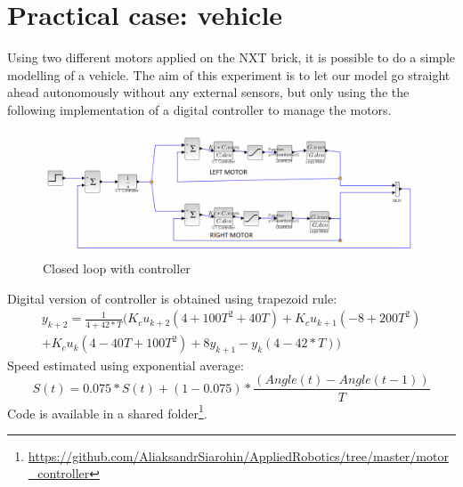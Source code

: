 \documentclass[a4paper,12pt,oneside]{article}
\begin{document}
\section{Practical case: vehicle}
Using two different motors applied on the NXT brick, it is possible to do a simple modelling of a vehicle. The aim of this experiment is to let our model go straight ahead autonomously without any external sensors, but only using the the following implementation of a digital controller to manage the motors.
\begin{figure}[H]
	\vspace{-1em}
	\centering
	\includegraphics[width=\columnwidth]{./vehicle.png}
	\vspace{-1.5em}	
	\caption{Closed loop with controller}
	\label{fig:closed_loop_controller}
	\vspace{-1em}	
\end{figure}
Digital version of controller is obtained using trapezoid rule:
\begin{multline}
y_{k+2} = \frac{1}{4 + 42 * T} (K_cu_{k+2}(4 + 100T^2 + 40T) + K_cu_{k+1}(-8 + 200T^2) \\+ K_cu_{k}(4 - 40T + 100T^2) + 8y_{k+1} - y_{k}(4 - 42*T))
\end{multline}
Speed estimated using exponential average:
\begin{equation}
S(t) = 0.075 * S(t) + (1 - 0.075) * \frac{(Angle(t) - Angle(t-1))}{T}
\end{equation}
Code is available in a shared folder\footnote{\url{https://github.com/AliaksandrSiarohin/AppliedRobotics/tree/master/motor_controller}}.
\end{document}
